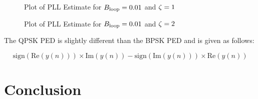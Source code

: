 \documentclass{article}
\begin{document}
\begin{figure}[H]
	\centerline{}
	\caption{Plot of PLL Estimate for $\protect{B_\text{loop}} = 0.01$ and $\protect{\zeta = 1}$}
	\label{fig::convergence_Bloop_0p01_damp_1}
\end{figure}

\begin{figure}[H]
	\centerline{}
	\caption{Plot of PLL Estimate for $\protect{B_\text{loop}} = 0.01$ and $\protect{\zeta = 2}$}
	\label{fig::convergence_Bloop_0p01_damp_2}
\end{figure}

\noindent The QPSK PED is slightly different than the BPSK PED and is given as follows:

\begin{equation}
	\text{sign}(\text{Re}(y(n))) \times \text{Im}(y(n)) - \text{sign}(\text{Im}(y(n))) \times \text{Re}(y(n))
\end{equation}

\section{Conclusion}
\end{document}

